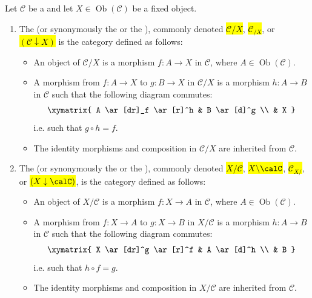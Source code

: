 
\begin{definition} \label{definition:category_of_objects_over_under_a_fixed_object_in_a_category}
Let $\mathcal{C}$ be a  and let $X \in \operatorname{Ob}(\mathcal{C})$ be a fixed object.
\begin{enumerate}
    \item 
        The  (or synonymously the  or the ), commonly denoted \hl{$\mathcal{C}/X$}, \hl{$\mathcal{C}_{/X}$}, or \hl{$(\mathcal{C} \downarrow X)$} is the category defined as follows:
        \begin{itemize}
            \item An object of $\mathcal{C}/X$ is a morphism $f \colon A \to X$ in $\mathcal{C}$, where $A \in \operatorname{Ob}(\mathcal{C})$.
            \item A morphism from $f \colon A \to X$ to $g \colon B \to X$ in $\mathcal{C}/X$ is a morphism $h \colon A \to B$ in $\mathcal{C}$ such that the following diagram commutes:
            $$
            \begin{aligned}
            \xymatrix{
            A \ar[dr]_f \ar[r]^h & B \ar[d]^g \\
            & X
            }
            \end{aligned}
            $$
            i.e. such that $g \circ h = f$.
            \item The identity morphisms and composition in $\mathcal{C}/X$ are inherited from $\mathcal{C}$.
        \end{itemize}

    \item 
    The  (or synonymously the  or the ), commonly denoted \hl{$X/\mathcal{C}$}, \hl{$X \backslash \calC$}, \hl{$\mathcal{C}_{X/}$}, or \hl{$(X \downarrow \calC)$}, is the category defined as follows:
    \begin{itemize}
        \item An object of $X/\mathcal{C}$ is a morphism $f \colon X \to A$ in $\mathcal{C}$, where $A \in \operatorname{Ob}(\mathcal{C})$.
        \item A morphism from $f \colon X \to A$ to $g \colon X \to B$ in $X/\mathcal{C}$ is a morphism $h \colon A \to B$ in $\mathcal{C}$ such that the following diagram commutes:
        $$
        \begin{aligned}
        \xymatrix{
        X \ar[dr]^g \ar[r]^f & A \ar[d]^h \\
        & B
        }
        \end{aligned}
        $$
        i.e. such that $h \circ f = g$.
        \item The identity morphisms and composition in $X/\mathcal{C}$ are inherited from $\mathcal{C}$.
    \end{itemize}


\end{enumerate}
\end{definition}
